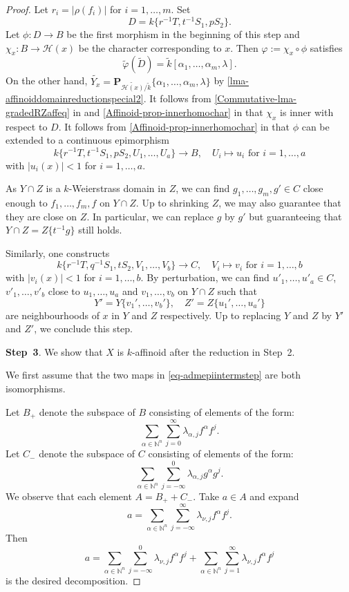 \begin{proof}
    Let $r_i=|\rho(f_i)|$ for $i=1,\ldots,m$. Set 
    \[
        D=k\{r^{-1}T,t^{-1}S_1,pS_2\}.  
    \]
    Let $\phi:D\rightarrow B$ be the first morphism in the beginning of this step and $\chi_x:B\rightarrow \mathscr{H}(x)$ be the character corresponding to $x$. Then $\varphi:=\chi_x\circ \phi$ satisfies
    \[
        \tilde{\varphi}(\tilde{D})=\tilde{k}[\alpha_1,\ldots,\alpha_m,\lambda].
    \]
    On the other hand, $\widetilde{Y_x}=\mathbf{P}_{\widetilde{\mathscr{H}(x)}/\tilde{k}}\{\alpha_1,\ldots,\alpha_m,\lambda\}$ by \cref{lma-affinoiddomainreductionspecial2}. It follows from \cref{Commutative-lma-gradedRZaffeq} in  and \cref{Affinoid-prop-innerhomochar} in  that $\chi_x$ is inner with respect to $D$. It follows from \cref{Affinoid-prop-innerhomochar} in  that $\phi$ can be extended to a continuous epimorphism
    \[
        k\{r^{-1}T,t^{-1}S_1,pS_2,U_1,\ldots,U_a\}\rightarrow B,\quad U_i\mapsto u_i\text{ for }i=1,\ldots,a  
    \]
    with $|u_i(x)|<1$ for $i=1,\ldots,a$.

    As $Y\cap Z$ is a $k$-Weierstrass domain in $Z$, we can find $g_1,\ldots,g_m,g'\in C$ close enough to $f_1,\ldots,f_m,f$ on $Y\cap Z$. Up to shrinking $Z$, we may also guarantee that they are close on $Z$. In particular, we can replace $g$ by $g'$ but guaranteeing that $Y\cap Z=Z\{t^{-1}g\}$ still holds.

    Similarly, one constructs 
    \[
        k\{r^{-1}T,q^{-1}S_1,tS_2,V_1,\ldots,V_b\}\rightarrow C,\quad V_i\mapsto v_i\text{ for }i=1,\ldots,b  
    \]
    with $|v_i(x)|<1$ for $i=1,\ldots,b$.
    By perturbation, we can find $u'_1,\ldots,u'_a\in C$, $v'_1,\ldots,v'_b$ close to $u_1,\ldots,u_a$ and $v_1,\ldots,v_b$ on $Y\cap Z$ such that 
    \[
        Y'=Y\{v_1',\ldots,v_b'\},\quad Z'=Z\{u_1',\ldots,u_a'\}  
    \]
    are neighbourhoods of $x$ in $Y$ and $Z$ respectively. Up to replacing $Y$ and $Z$ by $Y'$ and $Z'$, we conclude this step.
    
    \textbf{Step~3}. We show that $X$ is $k$-affinoid after the reduction in Step~2.

    We first assume that the two maps in \eqref{eq-admepiintermstep} are both isomorphisms.
    
    Let $B_+$ denote the subspace of $B$ consisting of elements of the form:
    \[
        \sum_{\alpha\in \mathbb{N}^n}\sum_{j=0}^{\infty} \lambda_{\alpha,j}f^{\alpha} f^j.  
    \]
    Let $C_-$ denote the subspace of $C$ consisting of elements of the form:
    \[
        \sum_{\alpha\in \mathbb{N}^n}\sum_{j=-\infty}^{0} \lambda_{\alpha,j}g^{\alpha} g^j.  
    \]
    We observe that each element $A=B_++C_-$. Take $a\in A$ and expand
    \[
        a=\sum_{\alpha\in \mathbb{N}^n}\sum_{j=-\infty}^{\infty} \lambda_{\nu,j}f^{\alpha}f^j.  
    \]
    Then 
    \[
        a=  \sum_{\alpha\in \mathbb{N}^n}\sum_{j=-\infty}^{0} \lambda_{\nu,j}f^{\alpha}f^j+\sum_{\alpha\in \mathbb{N}^n}\sum_{j=1}^{\infty} \lambda_{\nu,j}f^{\alpha}f^j  
    \]
    is the desired decomposition.


\end{proof}
